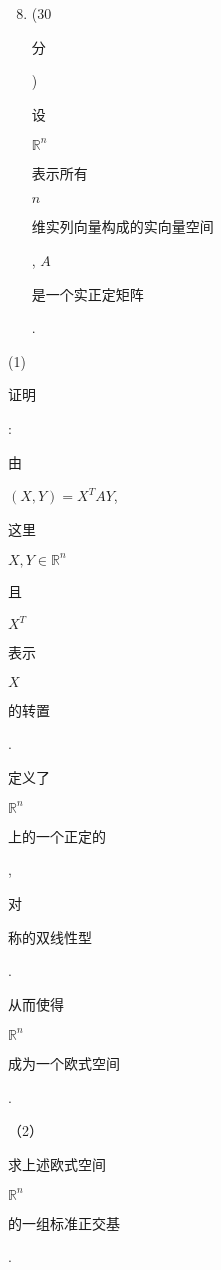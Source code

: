 \documentclass[10pt]{article}
\begin{document}
\begin{enumerate}
  \setcounter{enumi}{7}
  \item (30 \begin{CJK}{UTF8}{mj}分\end{CJK}) \begin{CJK}{UTF8}{mj}设\end{CJK} $\mathbb{R}^{n}$ \begin{CJK}{UTF8}{mj}表示所有\end{CJK} $n$ \begin{CJK}{UTF8}{mj}维实列向量构成的实向量空间\end{CJK}, $A$ \begin{CJK}{UTF8}{mj}是一个实正定矩阵\end{CJK}.
\end{enumerate}
(1) \begin{CJK}{UTF8}{mj}证明\end{CJK}: \begin{CJK}{UTF8}{mj}由\end{CJK} $(X, Y)=X^{T} A Y$, \begin{CJK}{UTF8}{mj}这里\end{CJK} $X, Y \in \mathbb{R}^{n}$ \begin{CJK}{UTF8}{mj}且\end{CJK} $X^{T}$ \begin{CJK}{UTF8}{mj}表示\end{CJK} $X$ \begin{CJK}{UTF8}{mj}的转置\end{CJK}.\begin{CJK}{UTF8}{mj}定义了\end{CJK} $\mathbb{R}^{n}$ \begin{CJK}{UTF8}{mj}上的一个正定的\end{CJK}, \begin{CJK}{UTF8}{mj}对\end{CJK} \begin{CJK}{UTF8}{mj}称的双线性型\end{CJK}. \begin{CJK}{UTF8}{mj}从而使得\end{CJK} $\mathbb{R}^{n}$ \begin{CJK}{UTF8}{mj}成为一个欧式空间\end{CJK}.

（2）\begin{CJK}{UTF8}{mj}求上述欧式空间\end{CJK} $\mathbb{R}^{n}$ \begin{CJK}{UTF8}{mj}的一组标准正交基\end{CJK}.
\end{document}
